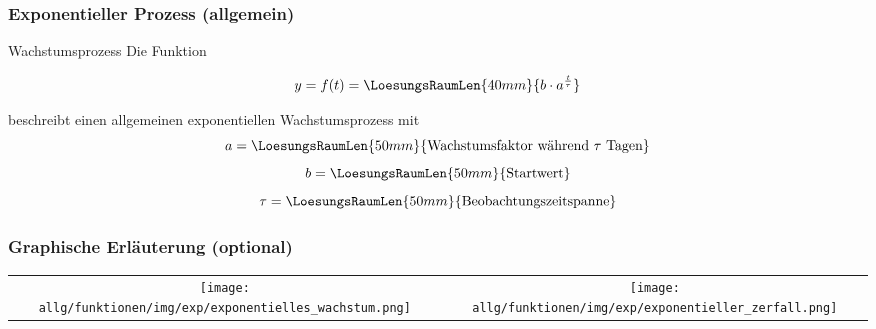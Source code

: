 \subsubsection{Exponentieller Prozess (allgemein)}

\begin{gesetz}{Wachstumsprozess}{}
  Die Funktion

  $$y = f(t) = \LoesungsRaumLen{40mm}{b\cdot{}a^{\frac{t}{\tau}}}$$
  
  beschreibt einen allgemeinen exponentiellen Wachstumsprozess mit
  $$   a=\LoesungsRaumLen{50mm}{\text{Wachstumsfaktor während } \tau \text{ Tagen} }$$
  $$   b=\LoesungsRaumLen{50mm}{\text{Startwert}}$$
  $$\tau=\LoesungsRaumLen{50mm}{\text{Beobachtungszeitspanne}}$$
\end{gesetz}




\newpage

\subsubsection{Graphische Erläuterung (optional)}


\begin{tabular}{cc}%
  \texttt{[image: allg/funktionen/img/exp/exponentielles\_wachstum.png]} &
  \texttt{[image: allg/funktionen/img/exp/exponentieller\_zerfall.png]}\\
\end{tabular}


